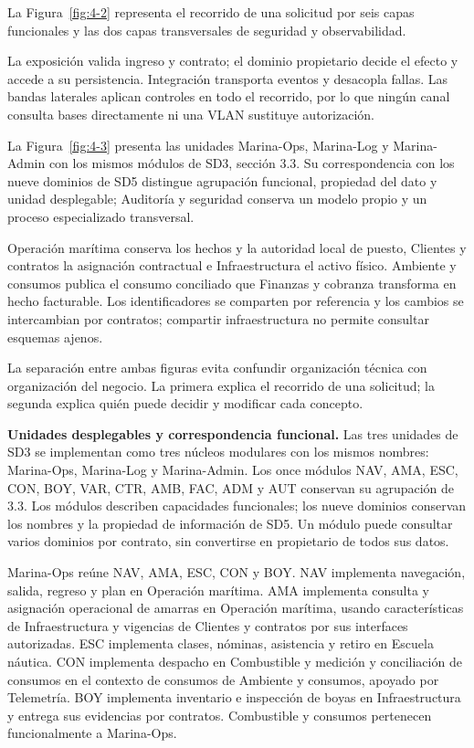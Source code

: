 La Figura~\ref{fig:4-2} representa el recorrido de una solicitud por seis capas funcionales y las dos capas transversales de seguridad y observabilidad.



La exposición valida ingreso y contrato; el dominio propietario decide el efecto y accede a su persistencia. Integración transporta eventos y desacopla fallas. Las bandas laterales aplican controles en todo el recorrido, por lo que ningún canal consulta bases directamente ni una VLAN sustituye autorización.


La Figura~\ref{fig:4-3} presenta las unidades Marina-Ops, Marina-Log y Marina-Admin con los mismos módulos de SD3, sección 3.3. Su correspondencia con los nueve dominios de SD5 distingue agrupación funcional, propiedad del dato y unidad desplegable; Auditoría y seguridad conserva un modelo propio y un proceso especializado transversal.



Operación marítima conserva los hechos y la autoridad local de puesto, Clientes y contratos la asignación contractual e Infraestructura el activo físico. Ambiente y consumos publica el consumo conciliado que Finanzas y cobranza transforma en hecho facturable. Los identificadores se comparten por referencia y los cambios se intercambian por contratos; compartir infraestructura no permite consultar esquemas ajenos.


La separación entre ambas figuras evita confundir organización técnica con organización del negocio. La primera explica el recorrido de una solicitud; la segunda explica quién puede decidir y modificar cada concepto.



\textbf{Unidades desplegables y correspondencia funcional.} Las tres unidades de SD3 se implementan como tres núcleos modulares con los mismos nombres: Marina-Ops, Marina-Log y Marina-Admin. Los once módulos NAV, AMA, ESC, CON, BOY, VAR, CTR, AMB, FAC, ADM y AUT conservan su agrupación de 3.3. Los módulos describen capacidades funcionales; los nueve dominios conservan los nombres y la propiedad de información de SD5. Un módulo puede consultar varios dominios por contrato, sin convertirse en propietario de todos sus datos.

Marina-Ops reúne NAV, AMA, ESC, CON y BOY. NAV implementa navegación, salida, regreso y plan en Operación marítima. AMA implementa consulta y asignación operacional de amarras en Operación marítima, usando características de Infraestructura y vigencias de Clientes y contratos por sus interfaces autorizadas. ESC implementa clases, nóminas, asistencia y retiro en Escuela náutica. CON implementa despacho en Combustible y medición y conciliación de consumos en el contexto de consumos de Ambiente y consumos, apoyado por Telemetría. BOY implementa inventario e inspección de boyas en Infraestructura y entrega sus evidencias por contratos. Combustible y consumos pertenecen funcionalmente a Marina-Ops.

